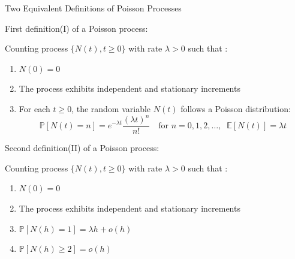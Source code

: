 \documentclass{beamer}
\begin{document}
\begin{frame}{Two Equivalent Definitions of Poisson Processes}

    {\footnotesize \footnotesize
    \par First definition(I) of a Poisson process:
    \par Counting process $\{N(t), t \geq 0\}$ with rate $\lambda > 0$ such that :
    \begin{enumerate}
        \item $N(0) = 0$  
        \item The process exhibits independent and stationary increments  
        \item For each $t\geq 0$, the random variable $N(t)$ follows a Poisson distribution:
        \[
        \mathbb{P}[N(t) = n] = e^{-\lambda t} \frac{(\lambda t)^n}{n!} \quad \text{for } n = 0, 1, 2, \ldots, \;\; \mathbb{E}[N(t)] = \lambda t
        \]
    \end{enumerate}
    \par Second definition(II) of a Poisson process:
    \par Counting process $\{N(t), t \geq 0\}$ with rate $\lambda > 0$ such that :
    \begin{enumerate}
        \item $N(0) = 0$  
        \item The process exhibits independent and stationary increments
        \item $\mathbb{P}[N(h) = 1] = \lambda h + o(h)$
        \item $\mathbb{P}[N(h) \geq 2] = o(h)$
    \end{enumerate}
    }
\end{frame}
\end{document}
